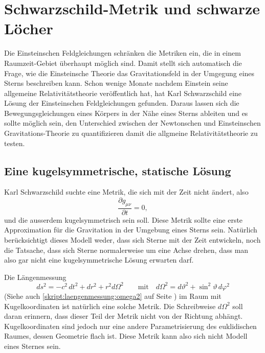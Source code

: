 %
%
%
\chapter{Schwarzschild-Metrik und schwarze Löcher%
\label{skript:chapter:schwarzschild}}
\rhead{}
Die Einsteinschen Feldgleichungen schränken die Metriken ein,
die in einem Raumzeit-Gebiet über\-haupt möglich sind.
Damit stellt sich automatisch die Frage, wie die Einsteinsche Theorie 
das Gravitationsfeld in der Umgegung eines Sterns beschreiben kann.
Schon wenige Monate nachdem Einstein seine allgemeine Relativitätstheorie
veröffentlich hat, hat Karl Schwarzschild eine Lösung der Einsteinschen
Feldgleichungen gefunden.
%
Daraus lassen sich die Bewegungsgleichungen eines Körpers in der Nähe
eines Sterns ableiten und es sollte möglich sein, den Unterschied zwischen
der Newtonschen und Einsteinschen Gravitations-Theorie zu quantifizieren
damit die allgmeine Relativitätstheorie zu testen.

\section{Eine kugelsymmetrische, statische Lösung}
\label{skript:schwarzschild:kugelsymmetrischeloesung}
Karl Schwarzschild suchte eine Metrik, die sich mit der Zeit nicht ändert,
also
\[
\frac{\partial g_{\mu\nu}}{\partial t}=0,
\]
und die ausserdem kugelsymmetrisch sein soll.
Diese Metrik sollte eine erste Approximation für die Gravitation in
der Umgebung eines Sterns sein.
Natürlich berücksichtigt dieses Modell weder, dass sich Sterne mit
der Zeit entwickeln, noch die Tatsache, dass sich Sterne normalerweise
um eine Achse drehen, dass man also gar nicht eine kugelsymmetrische
Lösung erwarten darf.

Die Längenmessung
\begin{equation}
ds^2
=
-c^2\,dt^2 + dr^2 + r^2 d\Omega^2
\qquad
\text{mit}
\quad
d\Omega^2 = d\vartheta^2 + \sin^2\vartheta\,d\varphi^2
\label{skript:kruemmung:euklid}
\end{equation}
(Siehe auch \eqref{skript:laengenmessung:omega2} auf Seite
\pageref{skript:laengenmessung:omega2})
im Raum mit Kugelkoordinaten ist natürlich eine solche Metrik.
Die Schreibweise $d\Omega^2$ soll daran erinnern, dass dieser Teil der
Metrik nicht von der Richtung abhängt.
Kugelkoordinaten sind jedoch nur eine andere Parametrisierung des euklidischen
Raumes, dessen Geometrie flach ist.
Diese Metrik kann also sich nicht Modell eines Sternes sein.

